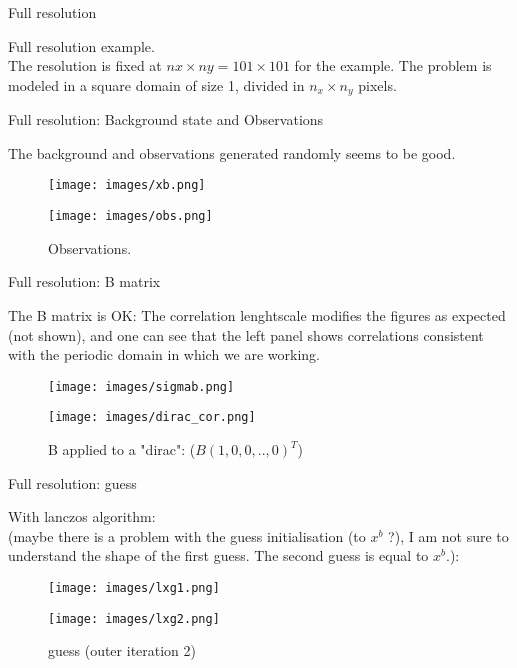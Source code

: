 \documentclass[francais]{beamer}
\begin{document}
\begin{frame}{Full resolution}
\begin{center}
{\huge Full resolution example.}\\
\vspace{+1cm}
The resolution is fixed at $nx\times ny=101 \times 101$ for the example. The problem is modeled in a square domain of size 1, divided in $n_x \times n_y$ pixels.\\
\end{center}
\end{frame}

\begin{frame}{Full resolution: Background state and Observations}
\begin{center}
The background and observations generated randomly seems to be good.\\
\begin{figure}
  \texttt{[image: images/xb.png]}
  \caption{background state $x^b$.}
\endminipage\hfill
{}
  \texttt{[image: images/obs.png]}
  \caption{Observations.}
\endminipage
\end{figure}
\end{center}
\end{frame}

\begin{frame}{Full resolution: B matrix}
\begin{center}
The B matrix is OK: The correlation lenghtscale modifies the figures as expected (not shown), and one can see that the left panel shows correlations consistent with the periodic domain in which we are working.\\ 
\begin{figure}
  \texttt{[image: images/sigmab.png]}
  \caption{Background error field $\sigma^b$.}
\endminipage\hfill
{}
  \texttt{[image: images/dirac\_cor.png]}
  \caption{B applied to a "dirac": ($B(1,0,0,..,0)^T$)}
\endminipage
\end{figure}
\end{center}
\end{frame}

\begin{frame}{Full resolution: guess}
\begin{center}
With lanczos algorithm:\\
(maybe there is a problem with the guess initialisation (to $x^b$ ?), I am not sure to understand the shape of the first guess. The second guess is equal to $x^b$.):
\begin{figure}
  \texttt{[image: images/lxg1.png]}
  \caption{guess (outer iteration 1)}
\endminipage\hfill
{}
  \texttt{[image: images/lxg2.png]}
  \caption{guess (outer iteration 2)}
\endminipage
\end{figure}
\end{center}
\end{frame}
\end{document}

